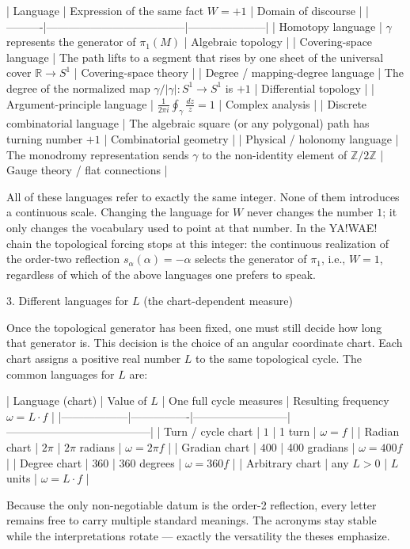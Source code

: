 | Language | Expression of the same fact \(W=+1\) | Domain of discourse |
|----------|--------------------------------------|---------------------|
| Homotopy language | \(\gamma\) represents the generator of \(\pi_1(M)\) | Algebraic topology |
| Covering-space language | The path lifts to a segment that rises by one sheet of the universal cover \(\mathbb{R}\to S^1\) | Covering-space theory |
| Degree / mapping-degree language | The degree of the normalized map \(\gamma/|\gamma|:S^1\to S^1\) is \(+1\) | Differential topology |
| Argument-principle language | \(\frac{1}{2\pi i}\oint_\gamma\frac{dz}{z}=1\) | Complex analysis |
| Discrete combinatorial language | The algebraic square (or any polygonal) path has turning number \(+1\) | Combinatorial geometry |
| Physical / holonomy language | The monodromy representation sends \(\gamma\) to the non-identity element of \(\mathbb{Z}/2\mathbb{Z}\) | Gauge theory / flat connections |

All of these languages refer to exactly the same integer. None of them introduces a continuous scale. Changing the language for \(W\) never changes the number \(1\); it only changes the vocabulary used to point at that number. In the YA!WAE! chain the topological forcing stops at this integer: the continuous realization of the order-two reflection \(s_\alpha(\alpha)=-\alpha\) selects the generator of \(\pi_1\), i.e., \(W=1\), regardless of which of the above languages one prefers to speak.

3. Different languages for \(L\) (the chart-dependent measure)

Once the topological generator has been fixed, one must still decide how long that generator is. This decision is the choice of an angular coordinate chart. Each chart assigns a positive real number \(L\) to the same topological cycle. The common languages for \(L\) are:

| Language (chart) | Value of \(L\) | One full cycle measures | Resulting frequency \(\omega=L\cdot f\) |
|------------------|----------------|--------------------------|---------------------------------------|
| Turn / cycle chart | \(1\) | 1 turn | \(\omega=f\) |
| Radian chart | \(2\pi\) | \(2\pi\) radians | \(\omega=2\pi f\) |
| Gradian chart | \(400\) | 400 gradians | \(\omega=400 f\) |
| Degree chart | \(360\) | 360 degrees | \(\omega=360 f\) |
| Arbitrary chart | any \(L>0\) | \(L\) units | \(\omega=L\cdot f\) | 

Because the only non-negotiable datum is the order-2 reflection, every letter remains free to carry multiple standard meanings. The acronyms stay stable while the interpretations rotate — exactly the versatility the theses emphasize.
